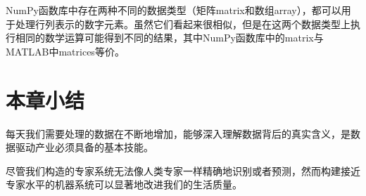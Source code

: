 \begin{tcolorbox}[title=NumPy矩阵与数组的区别]
    NumPy函数库中存在两种不同的数据类型（矩阵matrix和数组array），都可以用于处理行列表示的数字元素。虽然它们看起来很相似，但是在这两个数据类型上执行相同的数学运算可能得到不同的结果，其中NumPy函数库中的matrix与MATLAB中matrices等价。
\end{tcolorbox}

\section{本章小结}
每天我们需要处理的数据在不断地增加，能够深入理解数据背后的真实含义，是数据驱动产业必须具备的基本技能。

尽管我们构造的专家系统无法像人类专家一样精确地识别或者预测，然而构建接近专家水平的机器系统可以显著地改进我们的生活质量。